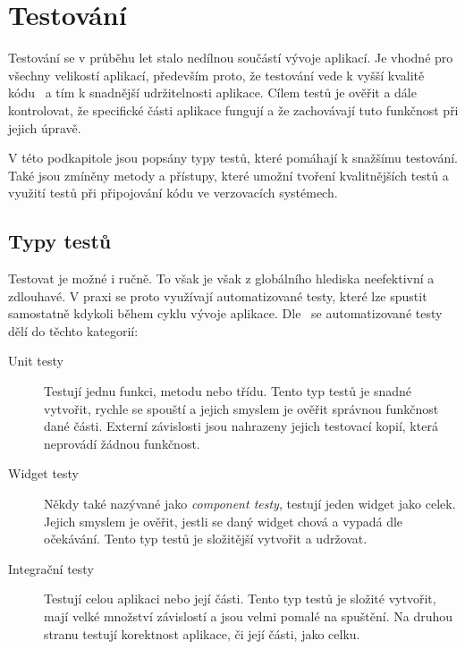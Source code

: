 \section{Testování}

Testování se v průběhu let stalo nedílnou součástí vývoje aplikací.
Je vhodné pro všechny velikostí aplikací,
především proto,
že testování vede k vyšší kvalitě kódu~\cite{testing_quality}
a tím k snadnější udržitelnosti aplikace.
Cílem testů je ověřit a dále kontrolovat,
že specifické části aplikace fungují
a že zachovávají tuto funkčnost při jejich úpravě.
\cite[kapitola~4]{martin_clean_architecture}

V této podkapitole jsou popsány typy testů,
které pomáhají k snažšímu testování.
Také jsou zmíněny metody a přístupy,
které umožní tvoření kvalitnějších testů
a využití testů při připojování kódu ve verzovacích systémech.

\subsection{Typy testů}

Testovat je možné i ručně.
To však je však z globálního hlediska neefektivní a zdlouhavé.
V praxi se proto využívají automatizované testy,
které lze spustit samostatně kdykoli během cyklu vývoje aplikace.
Dle~\cite{testing_flutter} se automatizované testy dělí do těchto kategorií:

\begin{description}
    \item[Unit testy] Testují jednu funkci, metodu nebo třídu.
    Tento typ testů je snadné vytvořit,
    rychle se spouští
    a jejich smyslem je ověřit správnou funkčnost dané části.
    Externí závislosti jsou nahrazeny jejich testovací kopií,
    která neprovádí žádnou funkčnost.
    \item[Widget testy] Někdy také nazývané jako \emph{component testy},
    testují jeden widget jako celek.
    Jejich smyslem je ověřit,
    jestli se daný widget chová a vypadá dle očekávání.
    Tento typ testů je složitější vytvořit a udržovat.
    \item[Integrační testy] Testují celou aplikaci nebo její části.
    Tento typ testů je složité vytvořit,
    mají velké množství závislostí a jsou velmi pomalé na spuštění.
    Na druhou stranu testují korektnost aplikace,
    či její části,
    jako celku.
\end{description}

